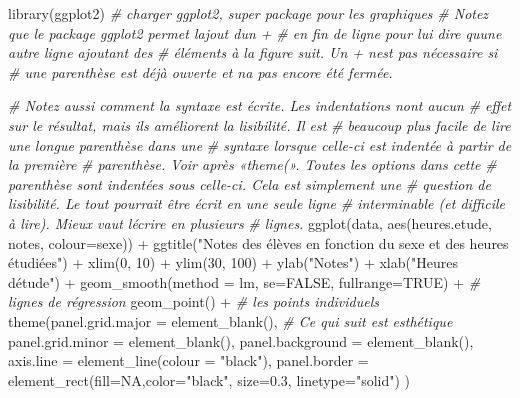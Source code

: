 \documentclass[
]{book}
\newenvironment{Shaded}{\begin{snugshade}}{\end{snugshade}}
\newcommand{\AttributeTok}[1]{\textcolor[rgb]{0.77,0.63,0.00}{#1}}
\newcommand{\CommentTok}[1]{\textcolor[rgb]{0.56,0.35,0.01}{\textit{#1}}}
\newcommand{\ConstantTok}[1]{\textcolor[rgb]{0.00,0.00,0.00}{#1}}
\newcommand{\DecValTok}[1]{\textcolor[rgb]{0.00,0.00,0.81}{#1}}
\newcommand{\FloatTok}[1]{\textcolor[rgb]{0.00,0.00,0.81}{#1}}
\newcommand{\FunctionTok}[1]{\textcolor[rgb]{0.00,0.00,0.00}{#1}}
\newcommand{\NormalTok}[1]{#1}
\newcommand{\SpecialCharTok}[1]{\textcolor[rgb]{0.00,0.00,0.00}{#1}}
\newcommand{\StringTok}[1]{\textcolor[rgb]{0.31,0.60,0.02}{#1}}
\begin{document}
\begin{Shaded}
\begin{Highlighting}[]
\FunctionTok{library}\NormalTok{(ggplot2) }\CommentTok{\# charger ggplot2, super package pour les graphiques}
\CommentTok{\# Notez que le package ggplot2 permet l\textquotesingle{}ajout d\textquotesingle{}un +}
\CommentTok{\# en fin de ligne pour lui dire qu\textquotesingle{}une autre ligne ajoutant des }
\CommentTok{\# éléments à la figure suit. Un + n\textquotesingle{}est pas nécessaire si }
\CommentTok{\# une parenthèse est déjà ouverte et n\textquotesingle{}a pas encore été fermée.}

\CommentTok{\# Notez aussi comment la syntaxe est écrite. Les indentations n\textquotesingle{}ont aucun}
\CommentTok{\# effet sur le résultat, mais ils améliorent la lisibilité. Il est }
\CommentTok{\# beaucoup plus facile de lire une longue parenthèse dans une }
\CommentTok{\# syntaxe lorsque celle{-}ci est indentée à partir de la première}
\CommentTok{\# parenthèse. Voir après «theme(». Toutes les options dans cette}
\CommentTok{\# parenthèse sont indentées sous celle{-}ci. Cela est simplement une }
\CommentTok{\# question de lisibilité. Le tout pourrait être écrit en une seule ligne}
\CommentTok{\# interminable (et difficile à lire). Mieux vaut l\textquotesingle{}écrire en plusieurs}
\CommentTok{\# lignes. }
\FunctionTok{ggplot}\NormalTok{(data, }\FunctionTok{aes}\NormalTok{(heures.etude, notes, }\AttributeTok{colour=}\NormalTok{sexe)) }\SpecialCharTok{+} 
  \FunctionTok{ggtitle}\NormalTok{(}\StringTok{"Notes des élèves en fonction du sexe et des heures étudiées"}\NormalTok{) }\SpecialCharTok{+}
  \FunctionTok{xlim}\NormalTok{(}\DecValTok{0}\NormalTok{, }\DecValTok{10}\NormalTok{) }\SpecialCharTok{+}
  \FunctionTok{ylim}\NormalTok{(}\DecValTok{30}\NormalTok{, }\DecValTok{100}\NormalTok{) }\SpecialCharTok{+}
  \FunctionTok{ylab}\NormalTok{(}\StringTok{"Notes"}\NormalTok{) }\SpecialCharTok{+} 
  \FunctionTok{xlab}\NormalTok{(}\StringTok{"Heures d\textquotesingle{}étude"}\NormalTok{) }\SpecialCharTok{+}
  \FunctionTok{geom\_smooth}\NormalTok{(}\AttributeTok{method =}\NormalTok{ lm, }\AttributeTok{se=}\ConstantTok{FALSE}\NormalTok{, }\AttributeTok{fullrange=}\ConstantTok{TRUE}\NormalTok{) }\SpecialCharTok{+} \CommentTok{\# lignes de régression}
  \FunctionTok{geom\_point}\NormalTok{() }\SpecialCharTok{+} \CommentTok{\# les points individuels}
  \FunctionTok{theme}\NormalTok{(}\AttributeTok{panel.grid.major =} \FunctionTok{element\_blank}\NormalTok{(), }\CommentTok{\# Ce qui suit est esthétique}
        \AttributeTok{panel.grid.minor =} \FunctionTok{element\_blank}\NormalTok{(),}
        \AttributeTok{panel.background =} \FunctionTok{element\_blank}\NormalTok{(), }
        \AttributeTok{axis.line =} \FunctionTok{element\_line}\NormalTok{(}\AttributeTok{colour =} \StringTok{"black"}\NormalTok{),}
        \AttributeTok{panel.border =} \FunctionTok{element\_rect}\NormalTok{(}\AttributeTok{fill=}\ConstantTok{NA}\NormalTok{,}\AttributeTok{color=}\StringTok{"black"}\NormalTok{,}
                                    \AttributeTok{size=}\FloatTok{0.3}\NormalTok{, }\AttributeTok{linetype=}\StringTok{"solid"}\NormalTok{)}
\NormalTok{        )}
\end{Highlighting}
\end{Shaded}
\end{document}

